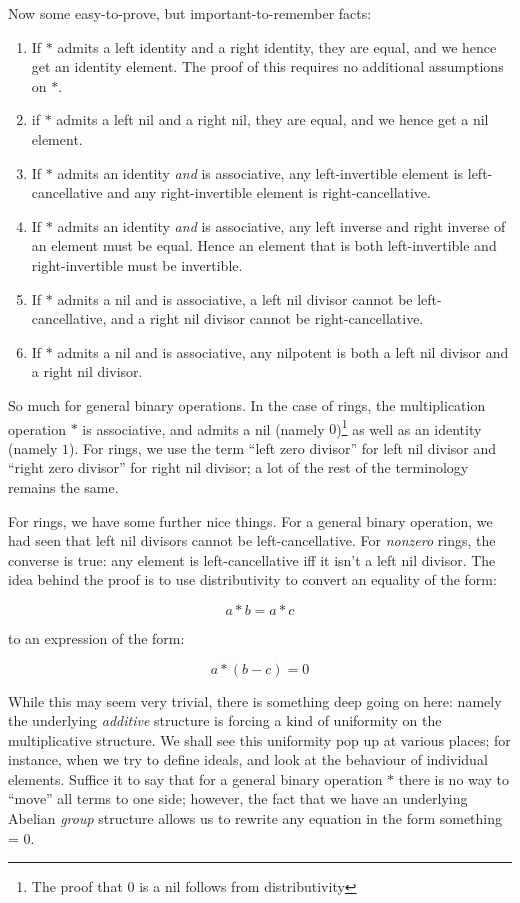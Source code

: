 \documentclass[a4paper]{amsart}
\begin{document}
Now some easy-to-prove, but important-to-remember facts:
\begin{enumerate}

\item If $*$ admits a left identity and a right identity, they are
  equal, and we hence get an identity element. The proof of this
  requires no additional assumptions on $*$.
\item if $*$ admits a left nil and a right nil, they are equal, and we
  hence get a nil element.
\item If $*$ admits an identity {\em and} is associative, any
  left-invertible element is left-cancellative and any
  right-invertible element is right-cancellative.
\item If $*$ admits an identity {\em and} is associative, any left
  inverse and right inverse of an element must be equal. Hence an
  element that is both left-invertible and right-invertible must be
  invertible.
\item If $*$ admits a nil and is associative, a left nil divisor cannot
  be left-cancellative, and a right nil divisor cannot be
  right-cancellative.
\item If $*$ admits a nil and is associative, any nilpotent is both a
  left nil divisor and a right nil divisor.
\end{enumerate}

So much for general binary operations. In the case of rings, the
multiplication operation $*$ is associative, and admits a nil (namely
$0$)\footnote{The proof that $0$ is a nil follows from distributivity}
as well as an identity (namely $1$). For rings, we use the term ``left
zero divisor'' for left nil divisor and ``right zero divisor'' for
right nil divisor; a lot of the rest of the terminology remains the
same.

For rings, we have some further nice things. For a general binary
operation, we had seen that left nil divisors cannot be
left-cancellative. For {\em nonzero} rings, the converse is true: any
element is left-cancellative iff it isn't a left nil divisor. The idea
behind the proof is to use distributivity to convert an equality of
the form:

$$a * b = a * c$$

to an expression of the form:

$$a * (b - c) = 0$$

While this may seem very trivial, there is something deep going on
here: namely the underlying {\em additive} structure is forcing a kind
of uniformity on the multiplicative structure. We shall see this
uniformity pop up at various places; for instance, when we try to
define ideals, and look at the behaviour of individual
elements. Suffice it to say that for a general binary operation $*$
there is no way to ``move'' all terms to one side; however, the fact
that we have an underlying Abelian {\em group} structure allows us to
rewrite any equation in the form something = 0.
\end{document}
